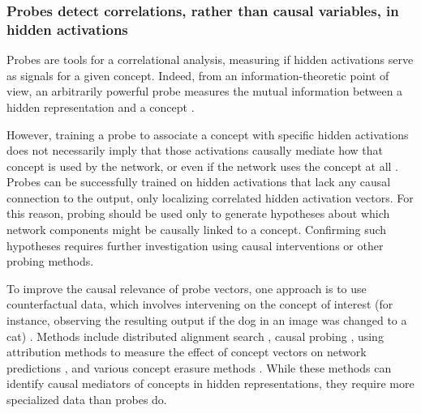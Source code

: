 \subsubsection{Probes detect correlations, rather than causal variables, in hidden activations}
\label{subsubsec:probes-spurious-correlations}


Probes are tools for a correlational analysis, measuring if hidden activations serve as signals for a given concept. Indeed, from an information-theoretic point of view, an arbitrarily powerful probe measures the mutual information between a hidden representation and a concept \citep{hewitt2019designinginterpretingprobescontrol, pimentel-etal-2020-information}. 

However, training a probe to associate a concept with specific hidden activations does not necessarily imply that those activations causally mediate how that concept is used by the network, or even if the network uses the concept at all \citep{ravichander2021probingprobingparadigmdoes, geiger2021causalabstractionsneuralnetworks, Elazar_2021, belinkov-2022-probing}. Probes can be successfully trained on hidden activations that lack any causal connection to the output, only localizing correlated hidden activation vectors. For this reason, probing should be used only to generate hypotheses about which network components might be causally linked to a concept. Confirming such hypotheses requires further investigation using causal interventions or other probing methods.

To improve the causal relevance of probe vectors, one approach is to use counterfactual data, which involves intervening on the concept of interest (for instance, observing the resulting output if the dog in an image was changed to a cat)  \citep{Elazar_2021,mueller2024missedcausesambiguouseffects, geiger2021causalabstractionsneuralnetworks}. Methods include distributed alignment search \citep{geiger2024findingalignmentsinterpretablecausal, wu2024interpretabilityscaleidentifyingcausal, huang2024ravelevaluatinginterpretabilitymethods}, causal probing \citep{guerner2024geometricnotioncausalprobing}, using attribution methods to measure the effect of concept vectors on network predictions \citep{kim_2018_activationvectors}, and various concept erasure methods \citep{ravfogel-etal-2020-null, ravfogel2024linearadversarialconcepterasure,Elazar_2021, belrose2023leaceperfectlinearconcept, belrose2023leaceperfectlinearconcept}. While these methods can identify causal mediators of concepts in hidden representations, they require more specialized data than probes do. 

